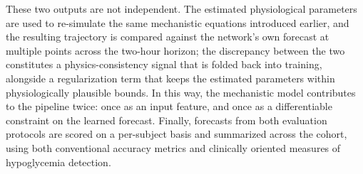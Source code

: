 \documentclass[journal]{IEEEtran}
\begin{document}
These two outputs are not independent. The estimated physiological parameters are used to re-simulate the same mechanistic equations introduced earlier, and the resulting trajectory is compared against the network's own forecast at multiple points across the two-hour horizon; the discrepancy between the two constitutes a physics-consistency signal that is folded back into training, alongside a regularization term that keeps the estimated parameters within physiologically plausible bounds. In this way, the mechanistic model contributes to the pipeline twice: once as an input feature, and once as a differentiable constraint on the learned forecast. Finally, forecasts from both evaluation protocols are scored on a per-subject basis and summarized across the cohort, using both conventional accuracy metrics and clinically oriented measures of hypoglycemia detection.
\end{document}
